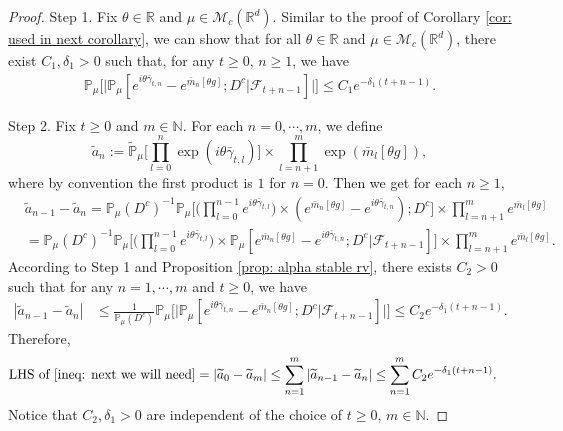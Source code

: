 \documentclass[12pt,a4paper]{amsart}
\theoremstyle{plain}
\theoremstyle{definition}
\numberwithin{equation}{section}
\begin{document}
\begin{proof}
    Step 1. Fix $\theta \in \mathbb R$ and $\mu \in \mathcal M_c(\mathbb R^d)$.
    Similar to the proof of Corollary \ref{cor: used in next corollary}, we can show that  for all $\theta\in \mathbb{R}$ and $\mu\in \mathcal{M}_c(\mathbb{R}^d)$, there exist $C_1,\delta_1>0$ such that, for any $t\geq 0$, $n\geq 1$, we have
\begin{align}
    \mathbb{P}_{\mu}\Big[\big|\mathbb{P}_{\mu}[e^{i\theta\bar{\gamma}_{t,n}}-e^{\bar{m}_n[\theta g]}; D^c | \mathscr F_{t+n-1}]\big|\Big]\leq C_1e^{-\delta_1(t+n-1)}.
\end{align}

    Step 2.
    Fix $t\geq 0$ and $m\in \mathbb{N}$.
    For each $n=0,\cdots,m$, we define
\[
    \widetilde{a}_n
    :=\mathbb{\widetilde{P}}_{\mu}\Big[\prod_{l=0}^{n}\exp(i\theta\bar{\gamma}_{t,l})\Big] \times \prod_{l=n+1}^{m}\exp(\bar{m}_l[\theta g]),
\]
    where by convention the first product is $1$ for $n=0$. Then we get for each $n \ge 1$,
\begin{align}
    &\widetilde{a}_{n-1} - \widetilde{a}_n
    =\mathbb{P}_{\mu}(D^c)^{-1}\mathbb{P}_{\mu}\Big[\Big(\prod_{l=0}^{n-1}e^{i\theta\bar{\gamma}_{t,l}}\Big)\times (e^{\bar{m}_n[\theta g]}-e^{i\theta \bar{\gamma}_{t,n}});D^c\Big] \times \prod_{l=n+1}^{m}e^{\bar{m}_l[\theta g]}
    \\&=\mathbb{P}_{\mu}(D^c)^{-1}\mathbb{P}_{\mu}\Big[\Big(\prod_{l=0}^{n-1}e^{i\theta\bar{\gamma}_{t,l}}\Big)\times \mathbb{P}_{\mu}[e^{\bar{m}_n[\theta g]}-e^{i\theta \bar{\gamma}_{t,n}};D^c|\mathscr{F}_{t+n-1}]\Big]\times \prod_{l=n+1}^{m}e^{\bar{m}_l[\theta g]}.
\end{align}
    According to Step 1 and Proposition \ref{prop: alpha stable rv}, there exists $C_2>0$ such that for any $n=1,\cdots, m$ and $t\geq 0$, we have
\begin{align}
    |\widetilde{a}_{n-1}- \widetilde{a}_n|
    &\leq \frac{1}{\mathbb{P}_{\mu}(D^c)}\mathbb{P}_{\mu}\Big[\big|\mathbb P_\mu[e^{i\theta\bar{\gamma}_{t,n}}-e^{\bar{m}_n[\theta g]}; D^c\big|\mathscr{F}_{t+n-1}]\big|\Big]
    \leq C_2 e^{-\delta_1(t+n-1)}.
\end{align}
    Therefore,
\begin{align}
    \text{LHS of \eqref{ineq: next we will need}}
    &= \left|\widetilde{a}_{0}-\widetilde{a}_m\right|
    \leq\sum_{n=1}^m\left|\widetilde{a}_{n-1}-\widetilde{a}_n\right|
    \leq \sum_{n=1}^m C_2 e^{-\delta_1(t+n-1)}.
\end{align}
	Notice that $C_2, \delta_1>0$ are independent of the choice of $t\geq 0$, $m\in \mathbb{N}$.
\end{proof}
\end{document}

